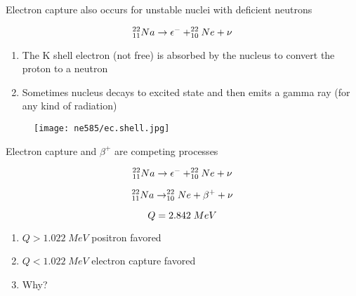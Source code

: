 \documentclass[aspectratio=1610,pdftex,dvipsnames,compress,xcolor={dvipsnames}]{beamer}
\begin{document}
\begin{frame}{Electron capture also occurs for unstable nuclei with deficient neutrons}

    \begin{equation}
        \LARGE
        ^{22}_{11}Na \rightarrow \epsilon^- + ^{22}_{10}Ne + \nu 
    \end{equation}

    \vspace*{\fill}

    \begin{enumerate}[series=outerlist,topsep=0pt,itemsep=21pt,leftmargin=*,label=(\arabic*)]
        \item[]The K shell electron (not free) is absorbed by the nucleus to convert the proton to a neutron
        \item[]Sometimes nucleus decays to excited state and then emits a gamma ray (for any kind of radiation)
    \end{enumerate}
\end{frame}


\begin{frame}{}
    \begin{figure}
        \centering
        \texttt{[image: ne585/ec.shell.jpg]}
    \end{figure}
\end{frame}


\begin{frame}{Electron capture and $\beta^+$ are competing processes}

    \begin{equation}
        \LARGE
        ^{22}_{11}Na \rightarrow \epsilon^- + ^{22}_{10}Ne + \nu 
    \end{equation}

    \begin{equation}
        \LARGE
        ^{22}_{11}Na \rightarrow ^{22}_{10}Ne + \beta^{+} + \nu 
    \end{equation}

    \begin{equation}
        \LARGE
        Q = 2.842 \; MeV
    \end{equation}

    \vspace*{\fill}

    \begin{enumerate}[series=outerlist,topsep=0pt,itemsep=21pt,leftmargin=*,label=(\arabic*)]
        \item[]$Q > 1.022 \; MeV$ positron favored
        \item[]$Q < 1.022 \; MeV$ electron capture favored
        \item[]Why?
    \end{enumerate}
\end{frame}
\end{document}
